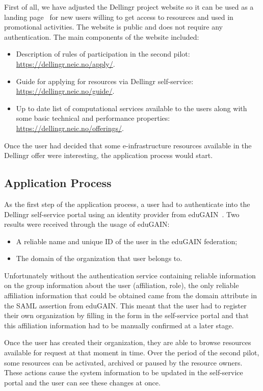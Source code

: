 \documentclass{article}
\newcommand{\dell}{Dellingr\xspace}
\newcommand{\einfra}{e-infrastructure\xspace}
\begin{document}
First of all, we have adjusted the \dell project website so it can be used as a landing page~\cite{dellingr-landing} for new users willing to get access to resources and used in promotional activities. 
The website is public and does not require any authentication.
The main components of the website included:
\begin{itemize}
    \item Description of rules of participation in the second pilot: \url{https://dellingr.neic.no/apply/}.
    \item Guide for applying for resources via \dell self-service: \url{https://dellingr.neic.no/guide/}.
    \item Up to date list of computational services available to the users along with some basic technical and performance properties: \url{https://dellingr.neic.no/offerings/}.
\end{itemize}
Once the user had decided that some \einfra resources available in the \dell offer were interesting, the application process would start. 

\subsection{Application Process}
\label{ssec:application}

As the first step of the application process, a user had to authenticate into the \dell self-service portal using an identity provider from eduGAIN~\cite{edugain}. 
Two results were received through the usage of eduGAIN:
\begin{itemize}
    \item A reliable name and unique ID of the user in the eduGAIN federation;
    \item The domain of the organization that user belongs to.
\end{itemize}
Unfortunately without the authentication service containing reliable information on the group information about the user (affiliation, role), 
the only reliable affiliation information that could be obtained came from the domain attribute in the SAML assertion from eduGAIN. 
This meant that the user had to register their own organization by filling in the form in the self-service portal and that this affiliation information had to be manually confirmed at a later stage.

Once the user has created their organization, they are able to browse resources available for request at that moment in time. 
Over the period of the second pilot, some resources can be activated, archived or paused by the resource owners.
These actions cause the system information to be updated in the self-service portal and the user can see these changes at once.
\end{document}

